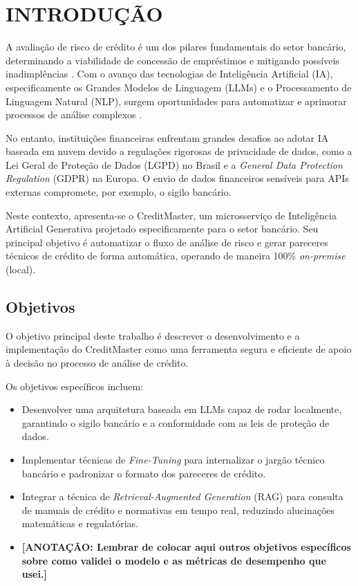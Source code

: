 \chapter{INTRODUÇÃO}

A avaliação de risco de crédito é um dos pilares fundamentais do setor bancário, determinando a viabilidade de concessão de empréstimos e mitigando possíveis inadimplências \cite{khandani2010consumer}. Com o avanço das tecnologias de Inteligência Artificial (IA), especificamente os Grandes Modelos de Linguagem (LLMs) e o Processamento de Linguagem Natural (NLP), surgem oportunidades para automatizar e aprimorar processos de análise complexos \cite{araci2019finbert}.

No entanto, instituições financeiras enfrentam grandes desafios ao adotar IA baseada em nuvem devido a regulações rigorosas de privacidade de dados, como a Lei Geral de Proteção de Dados (LGPD) no Brasil e a \textit{General Data Protection Regulation} (GDPR) na Europa. O envio de dados financeiros sensíveis para APIs externas compromete, por exemplo, o sigilo bancário.

Neste contexto, apresenta-se o CreditMaster, um microsserviço de Inteligência Artificial Generativa projetado especificamente para o setor bancário. Seu principal objetivo é automatizar o fluxo de análise de risco e gerar pareceres técnicos de crédito de forma automática, operando de maneira 100\% \textit{on-premise} (local).

\section{Objetivos}

O objetivo principal deste trabalho é descrever o desenvolvimento e a implementação do CreditMaster como uma ferramenta segura e eficiente de apoio à decisão no processo de análise de crédito.

Os objetivos específicos incluem:
\begin{itemize}
    \item Desenvolver uma arquitetura baseada em LLMs capaz de rodar localmente, garantindo o sigilo bancário e a conformidade com as leis de proteção de dados.
    \item Implementar técnicas de \textit{Fine-Tuning} para internalizar o jargão técnico bancário e padronizar o formato dos pareceres de crédito.
    \item Integrar a técnica de \textit{Retrieval-Augmented Generation} (RAG) para consulta de manuais de crédito e normativas em tempo real, reduzindo alucinações matemáticas e regulatórias.
    \item \textbf{[ANOTAÇÃO: Lembrar de colocar aqui outros objetivos específicos sobre como validei o modelo e as métricas de desempenho que usei.]}
\end{itemize}

